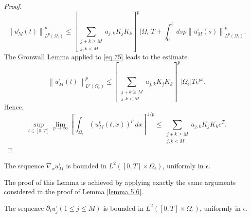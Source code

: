 \begin{proof}
\begin{equation}
  \left\|u_{M}^{\epsilon}(t)\right\|_{L^{p}\left(\Omega_{\epsilon}\right)}^{p} \leq\left[\sum_{\substack{j+k \geq M \\
j,k<M}} a_{j, k} K_{j} K_{k}\right]^{p}\left|\Omega_{\epsilon}\right| T+\int_{0}^{t} \, d  s p\left\|u_{M}^{\epsilon}(s)\right\|_{L^{p}\left(\Omega_{\epsilon}\right)}^{p}.
\label{eq 75}\end{equation}
The Gronwall Lemma applied to \eqref{eq 75} leads to the estimate
\begin{equation}
  \left\|u_{M}^{\epsilon}(t)\right\|_{L^{p}\left(\Omega_{\epsilon}\right)}^{p} \leq\left[\sum_{\substack{j+k \geq M \\
j,k<M}} a_{j, k} K_{j} K_{k}\right]^{p}\left|\Omega_{\epsilon}\right| T e^{p t}.
\label{eq 76}\end{equation}
Hence,
\begin{equation}
  \sup _{t \in[0, T]} \lim _{p \rightarrow \infty}\left[\int_{\Omega_{\epsilon}}\left(u_{M}^{\epsilon}(t, x)\right)^{p} \, d  x\right]^{1 / p} \leq \sum_{\substack{j+k \geq M \\
j,k<M}} a_{j, k} K_{j} K_{k} e^{T}.
\label{eq 77}\end{equation}
\end{proof}
\begin{lemma} The sequence $\nabla_{x} u_{M}^{\epsilon}$ is bounded in $L^{2}\left([0, T] \times \Omega_{\epsilon}\right)$, uniformly in $\epsilon$.
\label{lemma 5.8}\end{lemma}
The proof of  this Lemma is achieved by applying exactly the same arguments considered in the proof of Lemma \eqref{lemma 5.6}.
\begin{lemma} The sequence $\partial_{t} u_{j}^{\epsilon}(1 \leq j \leq M)$ is bounded in $L^{2}\left([0, T] \times \Omega_{\epsilon}\right)$, uniformly in $\epsilon$.
\label{lemma 5.9}\end{lemma}
